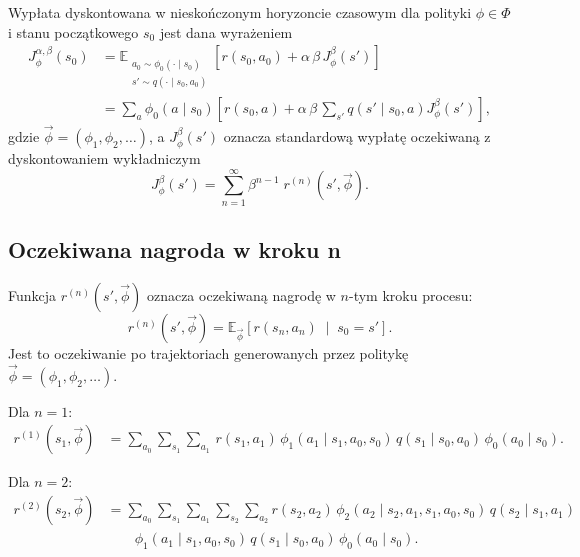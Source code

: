 Wypłata dyskontowana w nieskończonym horyzoncie czasowym dla polityki $\phi \in \Phi$ i stanu początkowego $s_0$ jest dana wyrażeniem
\begin{align}
    J_{\phi}^{\alpha,\beta}(s_0)
    &= \mathbb{E}_{\substack{a_0 \sim \phi_0(\cdot \mid s_0) \\ s' \sim q(\cdot \mid s_0,a_0)}}
      \left[ r(s_0,a_0) + \alpha\,\beta\, J_\phi^{\beta}(s') \right] \nonumber \\
    &= \sum_a \phi_0(a \mid s_0) \left[ r(s_0,a) + \alpha\,\beta\, \sum_{s'} q(s' \mid s_0,a) J_\phi^{\beta}(s') \right],
\label{eq:qh-return}
\end{align}
gdzie $\overrightarrow{\phi} = (\phi_1, \phi_2, \ldots)$, a $J_{\phi}^{\beta}(s')$ oznacza standardową wypłatę oczekiwaną z dyskontowaniem wykładniczym
\begin{equation}
J_\phi^{\beta}(s') = \sum_{n=1}^{\infty} \beta^{n-1} \; r^{(n)}(s', \overrightarrow{\phi}).
\label{eq:beta-value}
\end{equation}

\subsection{Oczekiwana nagroda w kroku n}

Funkcja $r^{(n)}(s', \overrightarrow{\phi})$ oznacza oczekiwaną nagrodę w $n$-tym kroku procesu:
\begin{equation}
r^{(n)}(s', \overrightarrow{\phi}) = \mathbb{E}_{\overrightarrow{\phi}}\!\left[ r(s_n, a_n) \;\middle|\; s_0 = s' \right].
\end{equation}
Jest to oczekiwanie po trajektoriach generowanych przez politykę $\overrightarrow{\phi} = (\phi_1, \phi_2, \ldots)$.

Dla $n = 1$:
\begin{align*}
  r^{(1)}(s_1, \overrightarrow{\phi})
  &= \sum_{a_0}\sum_{s_1}\sum_{a_1}\,
  r(s_1, a_1)\,
  \phi_1(a_1 \mid s_1,a_0,s_0)\,
    q(s_1 \mid s_0, a_0)\,
    \phi_0(a_0 \mid s_0).
\end{align*}

Dla $n = 2$:
\begin{align*}
  r^{(2)}(s_2, \overrightarrow{\phi})
    &= \sum_{a_0}\sum_{s_1}\sum_{a_1}\sum_{s_2}\sum_{a_2}
      r(s_2, a_2)\,
      \phi_2(a_2 \mid s_2,a_1,s_1,a_0,s_0) \,
      q(s_2 \mid s_1, a_1)\, \\
      &\qquad{}\phi_1(a_1 \mid s_1,a_0,s_0)\,
      q(s_1 \mid s_0, a_0)\,
      \phi_0(a_0 \mid s_0).
\end{align*}

